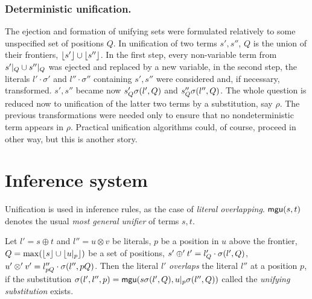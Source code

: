 \subsubsection{Deterministic unification.}
%
The ejection and formation of unifying sets were formulated relatively to
some unspecified set of positions $Q$.  In unification of two terms $s',s''$,
$Q$ is the union of their frontiers, \(\lfloor s'\rfloor\cup \lfloor s''\rfloor\).  In the first step, every non-variable term from \(s'|_{Q}\cup s''|_{Q}\) was ejected and replaced by a new variable, in the
second step, the literals $l'\cdot\sigma'$ and $l''\cdot\sigma''$ containing
$s',s''$ were considered and, if necessary, transformed.  $s',s''$ became now
\(s'_Q\sigma(l',Q)\) and \(s''_Q\sigma(l'',Q)\).  The whole question is reduced
now to unification of the latter two terms by a substitution, say $\rho$.
The previous transformations were needed only to ensure that no 
nondeterministic term appears in $\rho$.  Practical unification algorithms 
could, of course, proceed in other way, but this is another story.

\section{Inference system}\label{se:reasoning}
%
%
Unification is used in inference rules, as the
case of {\em literal overlapping}.  \({\sf mgu}(s,t)\) denotes the 
usual {\em most general unifier} of terms $s,t$.

\begin{definition}\label {def:literal-overalap}
Let \(l'=s\oplus t\) and \(l''=u \otimes v\) be literals, $p$ be a position
in $u$ above the frontier, \(Q=\max(\lfloor s\rfloor \cup \lfloor u|_{p}\rfloor)\) be a set of positions, \( s'\oplus' t' = l'_Q \cdot \sigma(l',Q)\),
\(u'\otimes' v' = l''_{pQ} \cdot \sigma(l'',pQ)\).  Then the literal $l'$
{\em overlaps} the literal $l''$ at a position $p$, if the substitution
\(\sigma(l',l'',p) ={\sf mgu} (s\sigma(l',Q), u|_{p}\sigma(l'',Q))\)
called the {\em unifying substitution} exists.
\end{definition}

